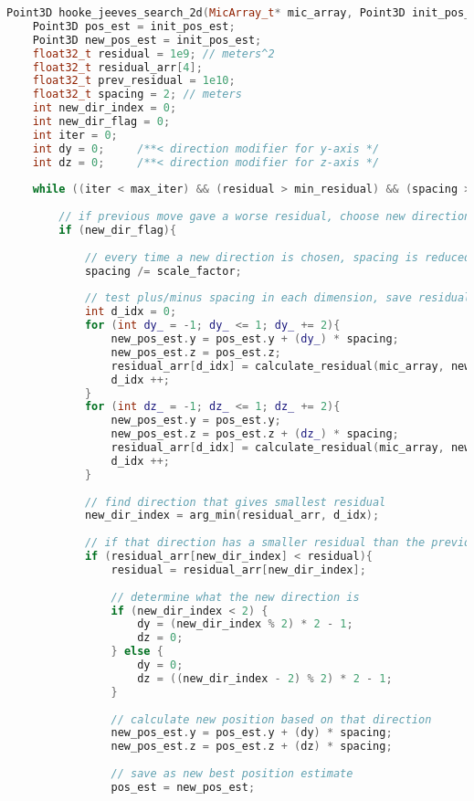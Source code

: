 \documentclass[11pt]{ucthesisCP}
\begin{document}
\begin{lstlisting}[language=C++]
Point3D hooke_jeeves_search_2d(MicArray_t* mic_array, Point3D init_pos_est, float32_t measured_time_shifts[], int max_iter, float32_t min_residual, float32_t min_spacing, float32_t scale_factor) {
	Point3D pos_est = init_pos_est;
	Point3D new_pos_est = init_pos_est;
	float32_t residual = 1e9; // meters^2
	float32_t residual_arr[4];
	float32_t prev_residual = 1e10;
	float32_t spacing = 2; // meters
	int new_dir_index = 0;
	int new_dir_flag = 0;
	int iter = 0;
	int dy = 0;     /**< direction modifier for y-axis */
	int dz = 0;     /**< direction modifier for z-axis */
	
	while ((iter < max_iter) && (residual > min_residual) && (spacing > min_spacing)){
		
		// if previous move gave a worse residual, choose new direction
		if (new_dir_flag){
			
			// every time a new direction is chosen, spacing is reduced
			spacing /= scale_factor;
			
			// test plus/minus spacing in each dimension, save residuals
			int d_idx = 0;
			for (int dy_ = -1; dy_ <= 1; dy_ += 2){
				new_pos_est.y = pos_est.y + (dy_) * spacing;
				new_pos_est.z = pos_est.z;
				residual_arr[d_idx] = calculate_residual(mic_array, new_pos_est, measured_time_shifts);
				d_idx ++;
			}
			for (int dz_ = -1; dz_ <= 1; dz_ += 2){
				new_pos_est.y = pos_est.y;
				new_pos_est.z = pos_est.z + (dz_) * spacing;
				residual_arr[d_idx] = calculate_residual(mic_array, new_pos_est, measured_time_shifts);
				d_idx ++;
			}
			
			// find direction that gives smallest residual
			new_dir_index = arg_min(residual_arr, d_idx);
			
			// if that direction has a smaller residual than the previous residual, move in that direction
			if (residual_arr[new_dir_index] < residual){
				residual = residual_arr[new_dir_index];
				
				// determine what the new direction is
				if (new_dir_index < 2) {
					dy = (new_dir_index % 2) * 2 - 1;
					dz = 0;
				} else {
					dy = 0;
					dz = ((new_dir_index - 2) % 2) * 2 - 1;
				}
				
				// calculate new position based on that direction
				new_pos_est.y = pos_est.y + (dy) * spacing;
				new_pos_est.z = pos_est.z + (dz) * spacing;
				
				// save as new best position estimate
				pos_est = new_pos_est;
				

\end{lstlisting}
\end{document}
